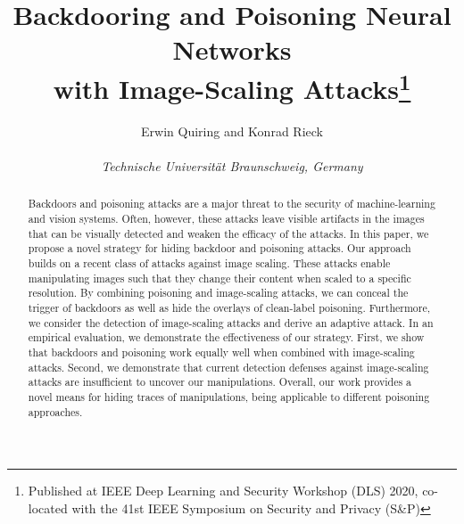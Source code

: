 \documentclass[conference]{IEEEtran}
\begin{document}
\title{Backdooring and Poisoning Neural Networks\\with 
	Image-Scaling Attacks\thanks{Published at {IEEE} Deep Learning and
		Security Workshop (DLS) 2020, co-located with the 41st {IEEE} 
		Symposium on Security and Privacy (S\&P)}}

\author{
	{\rm Erwin Quiring and 
		Konrad Rieck}\\[1mm]
	\begin{minipage}{8cm} 
		\centering \it
		Technische Universit\"at Braunschweig, Germany
	\end{minipage} 	  }

\maketitle



\begin{abstract}
Backdoors and poisoning attacks are a major threat to the security of 
machine-learning and vision systems. Often, however, these attacks 
leave visible artifacts in the images that can be visually detected and 
weaken the efficacy of the attacks.  In this paper, we propose a novel 
strategy for hiding backdoor and poisoning attacks. Our approach builds 
on a recent class of attacks against image scaling. These attacks 
enable manipulating images such that they change their content when 
scaled to a specific resolution. By combining poisoning and 
image-scaling attacks, we can conceal the trigger of backdoors as well 
as hide the overlays of clean-label poisoning. Furthermore, we consider 
the detection of image-scaling attacks and derive an adaptive attack. 
In an empirical evaluation, we demonstrate the effectiveness of our 
strategy.  First, we show that backdoors and poisoning work equally 
well when combined with image-scaling attacks. Second, we demonstrate 
that current detection defenses against image-scaling attacks are 
insufficient to uncover our manipulations. Overall, our work provides a 
novel means for hiding traces of manipulations, being applicable to 
different poisoning approaches.
\end{abstract}

\vspace{0.2cm}
\end{document}
